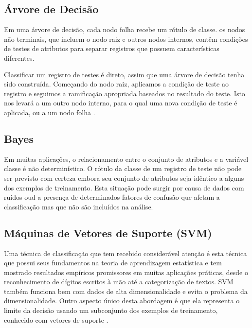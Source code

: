 \documentclass[
	12pt,				%
	openright,			%
	oneside,	
	a4paper,				%
	english,				%
	brazil				%
]{abntex2/abntex2} %
\begin{document}
	\subsection{Árvore de Decisão}
	
		Em uma árvore de decisão, cada nodo folha recebe um rótulo de classe. os nodos não terminais, que incluem o nodo raiz e outros nodos internos, contêm condições de testes de atributos para separar registros que possuem características diferentes.
		
		Classificar um registro de testes é direto, assim que uma árvore de decisão tenha sido construída. Começando do nodo raiz, aplicamos a condição de teste ao registro e seguimos a ramificação apropriada baseados no resultado do teste. Isto nos levará a um outro nodo interno, para o qual uma nova condição de teste é aplicada, ou a um nodo folha \cite{tan:2009}.
		
		
	\subsection{Bayes}
	
	Em muitas aplicações, o relacionamento entre o conjunto de atributos e a variável classe é não determinístico. O rótulo da classe de um registro de teste não pode ser previsto com certeza embora seu conjunto de atributos seja idêntico a alguns dos exemplos de treinamento. Esta situação pode surgir por causa de dados com ruídos oud a presença de determinados fatores de confusão que afetam a classificação mas que não são incluídos na análise.
	
	\subsection{Máquinas de Vetores de Suporte (SVM)}
	
	Uma técnica de classificação que tem recebido considerável atenção é esta técnica que possui seus fundamentos na teoria de aprendizagem estatística e tem mostrado resultados empíricos promissores em muitas aplicações práticas, desde o reconhecimento de dígitos escritos à mão até a categorização de textos. SVM também funciona bem com dados de alta dimensionalidade e evita o problema da dimensionalidade. Outro aspecto único desta abordagem é que ela representa o limite da decisão usando um subconjunto dos exemplos de treinamento, conhecido com vetores de suporte \cite{tan:2009}.
	
\end{document}
